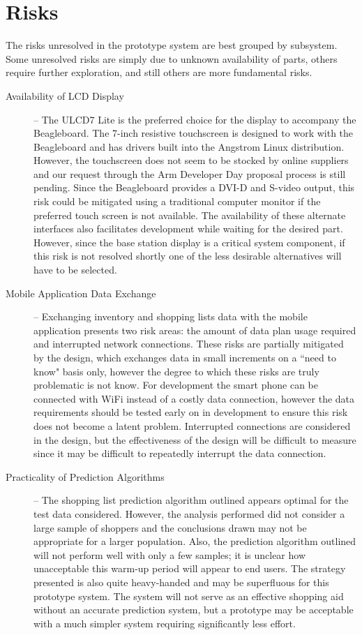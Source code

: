 \documentclass[11pt]{article} %
\begin{document}
\section{Risks}
The risks unresolved in the prototype system are best grouped by subsystem. Some unresolved risks are simply due to unknown availability of parts, others require further exploration, and still others are more fundamental risks.
\begin{description}
\item[Availability of LCD Display] -- The ULCD7 Lite is the preferred choice for the display to accompany the Beagleboard. The 7-inch resistive touchscreen is designed to work with the Beagleboard and has drivers built into the Angstrom Linux distribution. However, the touchscreen does not seem to be stocked by online suppliers and our request through the Arm Developer Day proposal process is still pending. Since the Beagleboard provides a DVI-D and S-video output, this risk could be mitigated using a traditional computer monitor if the preferred touch screen is not available. The availability of these alternate interfaces also facilitates development while waiting for the desired part. However, since the base station display is a critical system component, if this risk is not resolved shortly one of the less desirable alternatives will have to be selected.
\item[Mobile Application Data Exchange] -- Exchanging inventory and shopping lists data with the mobile application presents two risk areas: the amount of data plan usage required and interrupted network connections. These risks are partially mitigated by the design, which exchanges data in small increments on a ``need to know" basis only, however the degree to which these risks are truly problematic is not know. For development the smart phone can be connected with WiFi instead of a costly data connection, however the data requirements should be tested early on in development to ensure this risk does not become a latent problem. Interrupted connections are considered in the design, but the effectiveness of the design will be difficult to measure since it may be difficult to repeatedly interrupt the data connection.
\item[Practicality of Prediction Algorithms] -- The shopping list prediction algorithm outlined appears optimal for the test data considered. However, the analysis performed did not consider a large sample of shoppers and the conclusions drawn may not be appropriate for a larger population. Also, the prediction algorithm outlined will not perform well with only a few samples; it is unclear how unacceptable this warm-up period will appear to end users. The strategy presented is also quite heavy-handed and may be superfluous for this prototype system. The system will not serve as an effective shopping aid without an accurate prediction system, but a prototype may be acceptable with a much simpler system requiring significantly less effort.

\end{description}
\end{document}
